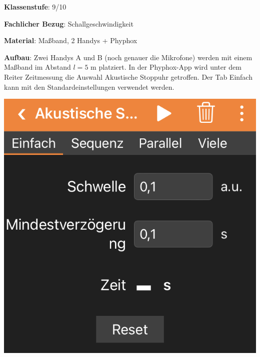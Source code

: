 \documentclass[../main.tex]{subfiles}
\begin{document}
\begin{tcolorbox}[
    width=\textwidth,
    height=\textheight,
    title=Phyphox: Schallgeschwindigkeit,
    fonttitle=\Large,
    before title=\vspace{0.2cm}, after title=\vspace{0.2cm},
    colback=white,
    title filled=true, 
    colbacktitle=myorange,
    colframe=black,
    coltitle=black,
    ]

    \vspace{0.2cm}

    \textbf{Klassenstufe}: 9/10

    \vspace{0.4cm}

    \textbf{Fachlicher Bezug}: Schallgeschwindigkeit

    \vspace{0.4cm}
    \textbf{Material}: Maßband, 2 Handys + Phyphox 

    \vspace{0.4cm}
    \begin{center}
        \def\svgwidth{400pt}
        
    \end{center}

    \vspace{0.5cm}
    \begin{minipage}[]{0.75\textwidth}
        \textbf{Aufbau}: Zwei Handys A und B (noch genauer die Mikrofone) werden mit einem Maßband im Abstand $l=5$ m platziert. In der Phyphox-App wird unter dem Reiter \glqq Zeitmessung\grqq{} die Auswahl \glqq Akustische Stoppuhr\grqq{} getroffen. Der Tab \glqq Einfach\grqq{} kann mit den Standardeinstellungen verwendet werden.
    \end{minipage}
    \hspace{0.5cm}
    \begin{minipage}[]{0.2\textwidth}
        \vspace{-0.2cm}
        \includegraphics[width=\textwidth]{img/app}
    \end{minipage}


\end{tcolorbox}
\end{document}
